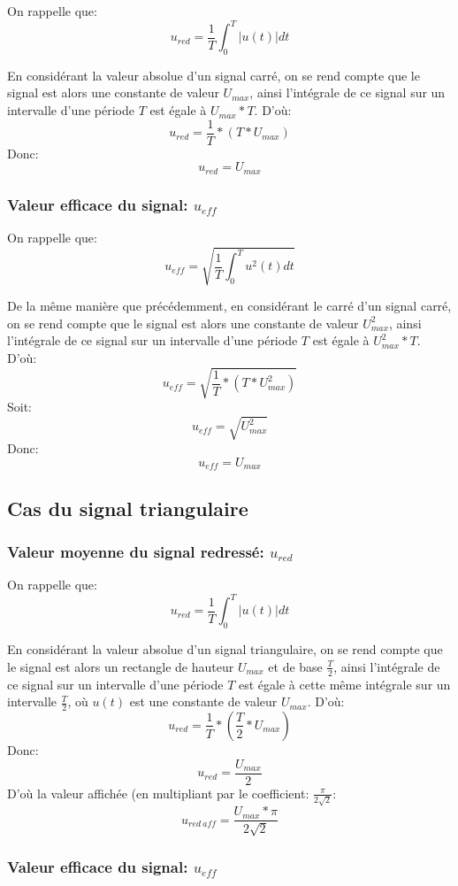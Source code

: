 \documentclass{article}
\begin{document}
On rappelle que: \[ u_{red}=\frac{1}{T}\int_{0}^{T} \left| u(t) \right| dt \]

En considérant la valeur absolue d'un signal carré, on se rend compte que le signal est alors une constante de valeur $U_{max}$, ainsi l'intégrale de ce signal sur un intervalle d'une période $T$ est égale à $U_{max} * T$.
D'où: \[ u_{red}=\frac{1}{T} * (T * U_{max}) \]
Donc: \[ u_{red}=U_{max} \]

\subsubsection{Valeur efficace du signal: $u_{eff}$}

On rappelle que: \[ u_{eff}=\sqrt{\frac{1}{T}\int_{0}^{T} u^2(t) dt} \]

De la même manière que précédemment, en considérant le carré d'un signal carré, on se rend compte que le signal est alors une constante de valeur $U_{max}^2$, ainsi l'intégrale de ce signal sur un intervalle d'une période $T$ est égale à $U_{max}^2 * T$.
D'où: \[ u_{eff}=\sqrt{\frac{1}{T} * (T * U_{max}^2)} \]
Soit: \[ u_{eff}=\sqrt{U_{max}^2} \]
Donc: \[ u_{eff}=U_{max} \]

\subsection{Cas du signal triangulaire}

\subsubsection{Valeur moyenne du signal redressé: $u_{red}$}

On rappelle que: \[ u_{red}=\frac{1}{T}\int_{0}^{T} \left| u(t) \right| dt \]

En considérant la valeur absolue d'un signal triangulaire, on se rend compte que le signal est alors un rectangle de hauteur $U_{max}$ et de base $\frac{T}{2}$, ainsi l'intégrale de ce signal sur un intervalle d'une période $T$ est égale à cette même intégrale sur un intervalle $\frac{T}{2}$, où $u(t)$ est une constante de valeur $U_{max}$.
D'où:  \[ u_{red}=\frac{1}{T} * (\frac{T}{2} * U_{max}) \]
Donc: \[ u_{red}=\frac{U_{max}}{2} \]
D'où la valeur affichée (en multipliant par le coefficient: $\frac{\pi}{2\sqrt2}$: \[ u_{red\ aff}=\frac{U_{max} * \pi}{2\sqrt2} \]

\subsubsection{Valeur efficace du signal: $u_{eff}$}
\end{document}
